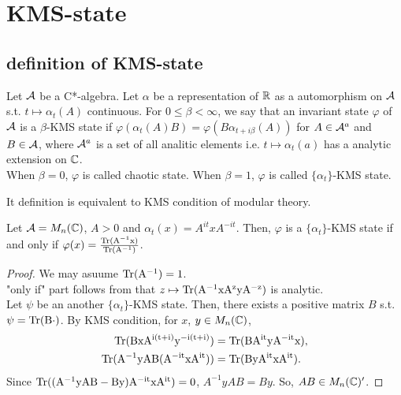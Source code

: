 \section{KMS-state}

\subsection{definition of KMS-state}
\begin{definition}
  Let $\mathcal{A}$ be a C*-algebra.
  Let $\alpha$ be a representation of $\mathbb{R}$ as a automorphism on $\mathcal{A}$ s.t. $t \mapsto \alpha_t(A)$ continuous.
  For $0 \leq \beta < \infty$, we say that an invariant state $\varphi$ of $\mathcal{A}$ is a $\beta$-KMS state if $\varphi(\alpha_t(A)B)=\varphi(B\alpha_{t+i\beta}(A))$ for $A \in \mathcal{A}^a$ and $B \in \mathcal{A}$,
  where $\mathcal{A}^a$ is a set of all analitic elements i.e. $t \mapsto \alpha_t(a)$ has a analytic extension on $\mathbb{C}$.\\
  When $\beta = 0$, $\varphi$ is called chaotic state.
  When $\beta=1$, $\varphi$ is called $\{\alpha_t\}$-KMS state.
\end{definition}

\begin{remark}
  It definition is equivalent to KMS condition of modular theory.
\end{remark}

\begin{proposition}
  Let $\mathcal{A} = M_n(\mathbb{C})$, $A > 0$ and $\alpha_t(x) = A^{it}xA^{-it}$.
  Then, $\varphi$ is a $\{\alpha_t\}$-KMS state  if and only if $\varphi(x)= \frac{\rm{Tr}(A^{-1}x)}{\rm{Tr}(A^{-1})}$.
\end{proposition}

\begin{proof}
  We may asuume $\rm{Tr}(A^{-1})=1$. \\
  "only if" part follows from that $z \mapsto \rm{Tr}(A^{-1}xA^zyA^{-z})$ is analytic. \\
  Let $\psi$ be an another $\{\alpha_t\}$-KMS state.
  Then, there exists a positive matrix $B$ s.t. $\psi = \rm{Tr}(B \cdot )$.
  By KMS condition, for $x$, $y \in M_n(\mathbb{C})$, 
  \begin{align*}
    \rm{Tr}(BxA^{i(t+i)}y^{-i(t+i)}) &= \rm{Tr}(BA^{it}yA^{-it}x), \\
    \rm{Tr}(A^{-1}yAB(A^{-it}xA^{it})) &= \rm{Tr}(ByA^{it}xA^{it}).
  \end{align*}
  Since $\rm{Tr}((A^{-1}yAB-By)A^{-it}xA^{it}) = 0$, $A^{-1}yAB=By$.
  So, $AB \in M_n(\mathbb{C})'$.
\end{proof}

